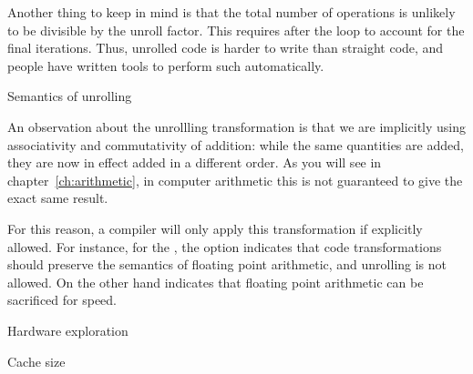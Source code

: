 Another thing to keep in mind is that the total number of operations
is unlikely to be divisible by the unroll factor. This requires
 after the loop to account for the final
iterations. Thus, unrolled code is harder to write than straight code,
and people have written tools to perform such
 automatically.

 {Semantics of unrolling}

An observation about the unrollling transformation
is that we are implicitly using
associativity and commutativity of addition: while the same quantities
are added, they are now in effect added in a different order. As you
will see in chapter~\ref{ch:arithmetic}, in computer arithmetic
this is not guaranteed to
give the exact same result. 

For this reason, a compiler will only apply this transformation
if explicitly allowed. For instance, for the ,
the option  indicates
that code transformations should preserve the semantics of
floating point arithmetic, and unrolling is not allowed.
On the other hand  indicates
that floating point arithmetic can be sacrificed for speed.

 {Hardware exploration}

 {Cache size}
\label{sec:coding-cachesize}

